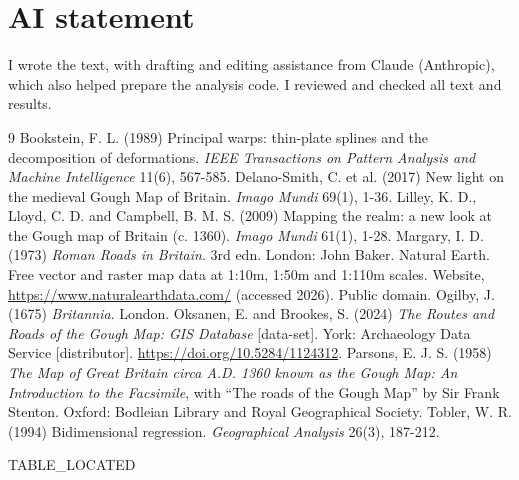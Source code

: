 \documentclass[11pt,a4paper]{article}
\begin{document}
\section*{AI statement}
I wrote the text, with drafting and editing assistance from Claude (Anthropic), which also helped prepare the analysis code. I reviewed and checked all text and results.

\begin{thebibliography}{9}
 Bookstein, F. L. (1989) Principal warps: thin-plate splines and the decomposition of deformations. \emph{IEEE Transactions on Pattern Analysis and Machine Intelligence} 11(6), 567-585.
 Delano-Smith, C. et al. (2017) New light on the medieval Gough Map of Britain. \emph{Imago Mundi} 69(1), 1-36.
 Lilley, K. D., Lloyd, C. D. and Campbell, B. M. S. (2009) Mapping the realm: a new look at the Gough map of Britain (c. 1360). \emph{Imago Mundi} 61(1), 1-28.
 Margary, I. D. (1973) \emph{Roman Roads in Britain}. 3rd edn. London: John Baker.
 Natural Earth. Free vector and raster map data at 1:10m, 1:50m and 1:110m scales. Website, \url{https://www.naturalearthdata.com/} (accessed 2026). Public domain.
 Ogilby, J. (1675) \emph{Britannia}. London.
 Oksanen, E. and Brookes, S. (2024) \emph{The Routes and Roads of the Gough Map: GIS Database} [data-set]. York: Archaeology Data Service [distributor]. \url{https://doi.org/10.5284/1124312}.
 Parsons, E. J. S. (1958) \emph{The Map of Great Britain circa A.D. 1360 known as the Gough Map: An Introduction to the Facsimile}, with ``The roads of the Gough Map'' by Sir Frank Stenton. Oxford: Bodleian Library and Royal Geographical Society.
 Tobler, W. R. (1994) Bidimensional regression. \emph{Geographical Analysis} 26(3), 187-212.
\end{thebibliography}

\clearpage
{{TABLE_LOCATED}}
\end{document}
